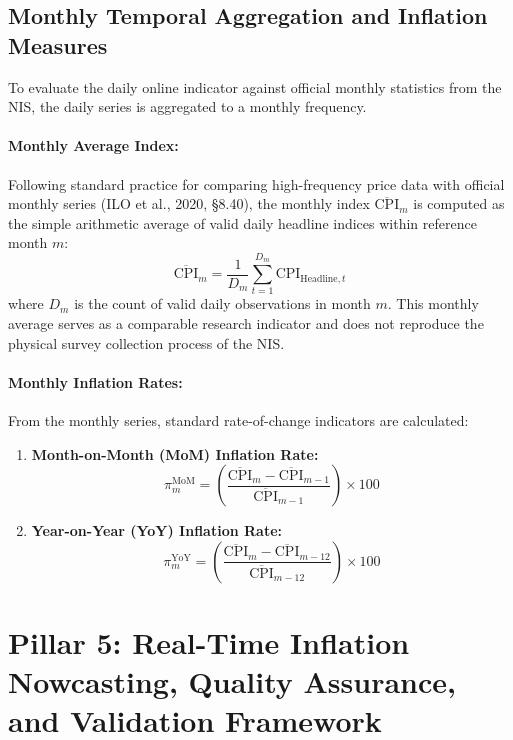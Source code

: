 \subsection{Monthly Temporal Aggregation and Inflation Measures}
\hs To evaluate the daily online indicator against official monthly statistics from the NIS, the daily series is aggregated to a monthly frequency.

\paragraph{Monthly Average Index:}
Following standard practice for comparing high-frequency price data with official monthly series (ILO et al., 2020, §8.40), the monthly index $\overline{\text{CPI}}_m$ is computed as the simple arithmetic average of valid daily headline indices within reference month $m$:
\begin{equation}
    \overline{\text{CPI}}_m = \frac{1}{D_m} \sum_{t=1}^{D_m} \text{CPI}_{\text{Headline}, t}
\end{equation}
where $D_m$ is the count of valid daily observations in month $m$. This monthly average serves as a comparable research indicator and does not reproduce the physical survey collection process of the NIS.

\paragraph{Monthly Inflation Rates:}
From the monthly series, standard rate-of-change indicators are calculated:
\begin{enumerate}
    \item \textbf{Month-on-Month (MoM) Inflation Rate:}
    \begin{equation}
        \pi_m^{\text{MoM}} = \left( \frac{\overline{\text{CPI}}_m - \overline{\text{CPI}}_{m-1}}{\overline{\text{CPI}}_{m-1}} \right) \times 100
    \end{equation}
    \item \textbf{Year-on-Year (YoY) Inflation Rate:}
    \begin{equation}
        \pi_m^{\text{YoY}} = \left( \frac{\overline{\text{CPI}}_m - \overline{\text{CPI}}_{m-12}}{\overline{\text{CPI}}_{m-12}} \right) \times 100
    \end{equation}
\end{enumerate}


\section{Pillar 5: Real-Time Inflation Nowcasting, Quality Assurance, and Validation Framework}\label{sec:nowcasting_engine}

